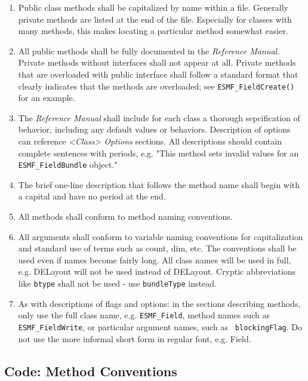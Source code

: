 \begin{enumerate}
\item Public class methods shall be capitalized by name within a file.
Generally private methods are listed at the end of the file.  Especially 
for classes with many methods, this makes locating a particular method 
somewhat easier.

\item All public methods shall be fully documented in the {\it Reference
Manual}.  Private methods without interfaces shall not appear at all.
Private methods that are overloaded with public interface shall follow
a standard format that clearly indicates that the methods are overloaded;
see {\tt ESMF\_FieldCreate()} for an example.

\item The {\it Reference Manual} shall include for each class a thorough
sepcification of behavior, including any default values or behaviors.
Description of options can reference {\it <Class> Options} sections.
All descriptions should contain complete sentences with periods,
e.g. "This method sets invalid values for an {\tt ESMF\_FieldBundle} object."

\item The brief one-line description that follows the method name shall
begin with a capital and have no period at the end.

\item All methods shall conform to method naming conventions.

\item All arguments shall conform to variable naming conventions
for capitalization and standard use of terms such as count, dim, etc.
The conventions shall be used even if names become fairly long.
All class names will be used in full, e.g. DELayout will not be
used instead of DELayout.  Cryptic abbreviations like {\tt btype} 
shall not be used - use {\tt bundleType} instead.

\item As with descriptions of flags and options:  in the sections describing
methods, only use the full class name, e.g. {\tt ESMF\_Field}, method names such
as {\tt ESMF\_FieldWrite}, or particular argument names, such as {\tt
blockingFlag}. Do not use the more informal short form in regular 
font, e.g. Field.

\end{enumerate}


\subsection{Code: Method Conventions}

